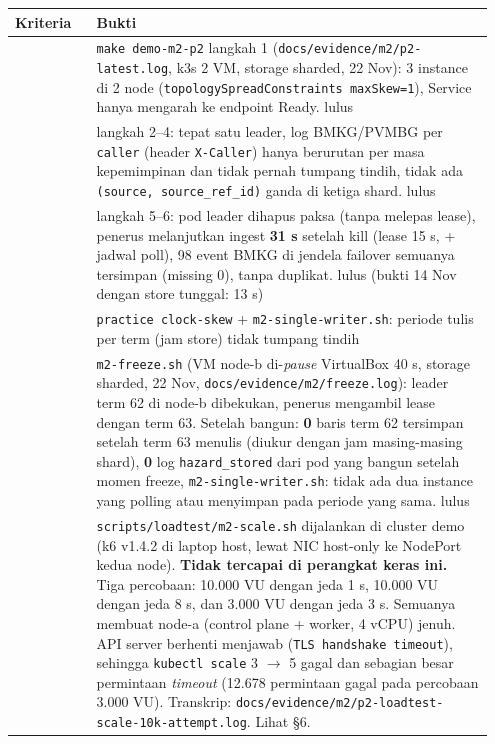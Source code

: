 {\small
\begin{longtable}{@{}>{\raggedright\arraybackslash}p{0.161\linewidth}>{\raggedright\arraybackslash}p{0.785\linewidth}@{}}
\toprule
\textbf{Kriteria} & \textbf{Bukti} \\
\midrule
\endhead
1 & \texttt{make demo-\allowbreak{}m2-\allowbreak{}p2} langkah 1 (\texttt{docs/\allowbreak{}evidence/\allowbreak{}m2/\allowbreak{}p2-\allowbreak{}latest.\allowbreak{}log}, k3s 2 VM, storage sharded, 22 Nov): 3 instance di 2 node (\texttt{topology\allowbreak{}Spread\allowbreak{}Constraints max\allowbreak{}Skew=\allowbreak{}1}), Service hanya mengarah ke endpoint Ready. lulus \\
2 & langkah 2--4: tepat satu leader, log BMKG/PVMBG per \texttt{caller} (header \texttt{X-\allowbreak{}Caller}) hanya berurutan per masa kepemimpinan dan tidak pernah tumpang tindih, tidak ada \texttt{(source,\allowbreak{} source\_\allowbreak{}ref\_\allowbreak{}id)} ganda di ketiga shard. lulus \\
3 & langkah 5--6: pod leader dihapus paksa (tanpa melepas lease), penerus melanjutkan ingest \textbf{31 s} setelah kill (lease 15 s, + jadwal poll), 98 event BMKG di jendela failover semuanya tersimpan (missing 0), tanpa duplikat. lulus (bukti 14 Nov dengan store tunggal: 13 s) \\
4 & \texttt{practice clock-\allowbreak{}skew} + \texttt{m2-\allowbreak{}single-\allowbreak{}writer.\allowbreak{}sh}: periode tulis per term (jam store) tidak tumpang tindih \\
5 & \texttt{m2-\allowbreak{}freeze.\allowbreak{}sh} (VM node-b di-\emph{pause} VirtualBox 40 s, storage sharded, 22 Nov, \texttt{docs/\allowbreak{}evidence/\allowbreak{}m2/\allowbreak{}freeze.\allowbreak{}log}): leader term 62 di node-b dibekukan, penerus mengambil lease dengan term 63. Setelah bangun: \textbf{0} baris term 62 tersimpan setelah term 63 menulis (diukur dengan jam masing-masing shard), \textbf{0} log \texttt{hazard\_\allowbreak{}stored} dari pod yang bangun setelah momen freeze, \texttt{m2-\allowbreak{}single-\allowbreak{}writer.\allowbreak{}sh}: tidak ada dua instance yang polling atau menyimpan pada periode yang sama. lulus \\
6 & \texttt{scripts/\allowbreak{}loadtest/\allowbreak{}m2-\allowbreak{}scale.\allowbreak{}sh} dijalankan di cluster demo (k6 v1.4.2 di laptop host, lewat NIC host-only ke NodePort kedua node). \textbf{Tidak tercapai di perangkat keras ini.} Tiga percobaan: 10.000 VU dengan jeda 1 s, 10.000 VU dengan jeda 8 s, dan 3.000 VU dengan jeda 3 s. Semuanya membuat node-a (control plane + worker, 4 vCPU) jenuh. API server berhenti menjawab (\texttt{TLS handshake timeout}), sehingga \texttt{kubectl scale} 3 $\rightarrow$ 5 gagal dan sebagian besar permintaan \emph{timeout} (12.678 permintaan gagal pada percobaan 3.000 VU). Transkrip: \texttt{docs/\allowbreak{}evidence/\allowbreak{}m2/\allowbreak{}p2-\allowbreak{}loadtest-\allowbreak{}scale-\allowbreak{}10k-\allowbreak{}attempt.\allowbreak{}log}. Lihat §6. \\

\end{longtable}}
